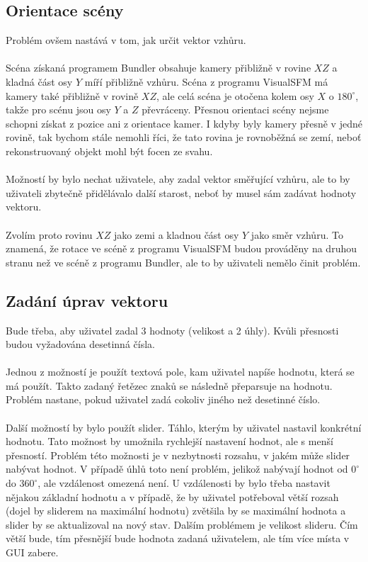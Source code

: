 \documentclass[11pt,twoside,a4paper]{book}
\begin{document}
\subsection{Orientace scény}
Problém ovšem nastává v tom, jak určit vektor vzhůru.
\paragraph{}
Scéna získaná programem Bundler obsahuje kamery přibližně v rovine $XZ$ a kladná část osy $Y$ míří přibližně vzhůru. Scéna z programu VisualSFM má kamery také přibližně v rovině $XZ$, ale celá scéna je otočena kolem osy $X$ o $180^{\circ}$, takže pro scénu jsou osy $Y$ a $Z$ převráceny. Přesnou orientaci scény nejsme schopni získat z pozice ani z orientace kamer. I kdyby byly kamery přesně v jedné rovině, tak bychom stále nemohli říci, že tato rovina je rovnoběžná se zemí, neboť rekonstruovaný objekt mohl být focen ze svahu. 
\paragraph{}
Možností by bylo nechat uživatele, aby zadal vektor směřující vzhůru, ale to by uživateli zbytečně přidělávalo další starost, neboť by musel sám zadávat hodnoty vektoru.
\paragraph{}
Zvolím proto rovinu $XZ$ jako zemi a kladnou část osy $Y$ jako směr vzhůru. To znamená, že rotace ve scéně z programu VisualSFM budou prováděny na druhou stranu než ve scéně z programu Bundler, ale to by uživateli nemělo činit problém.

\subsection{Zadání úprav vektoru}
Bude třeba, aby uživatel zadal 3 hodnoty (velikost a 2 úhly). Kvůli přesnosti budou vyžadována desetinná čísla. 
\paragraph{}
Jednou z možností je použít textová pole, kam uživatel napíše hodnotu, která se má použít. Takto zadaný řetězec znaků se následně přeparsuje na hodnotu. Problém nastane, pokud uživatel zadá cokoliv jiného než desetinné číslo.
\paragraph{}
Další možností by bylo použít slider. Táhlo, kterým by uživatel nastavil konkrétní hodnotu. Tato možnost by umožnila rychlejší nastavení hodnot, ale s menší přesností. Problém této možnosti je v nezbytnosti rozsahu, v jakém může slider nabývat hodnot. V případě úhlů toto není problém, jelikož nabývají hodnot od $0^{\circ}$ do $360^{\circ}$, ale vzdálenost omezená není. U vzdálenosti by bylo třeba nastavit nějakou základní hodnotu a v případě, že by uživatel potřeboval větší rozsah (dojel by sliderem na maximální hodnotu) zvětšila by se maximální hodnota a slider by se aktualizoval na nový stav. Dalším problémem je velikost slideru. Čím větší bude, tím přesnější bude hodnota zadaná uživatelem, ale tím více místa v GUI zabere.
\end{document}
